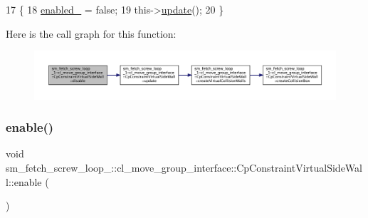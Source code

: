 \begin{DoxyCode}
17         \{
18             \hyperlink{classsm__fetch__screw__loop__1_1_1cl__move__group__interface_1_1CpConstraintVirtualSideWall_a9d17ffd44fe6739ea5e5e4113d470a60}{enabled\_} = \textcolor{keyword}{false};
19             this->\hyperlink{classsm__fetch__screw__loop__1_1_1cl__move__group__interface_1_1CpConstraintVirtualSideWall_a86d9dd2c82600e9b175ee0e456c797a8}{update}();
20         \}
\end{DoxyCode}
Here is the call graph for this function\+:
\nopagebreak
\begin{figure}[H]
\begin{center}
\leavevmode
\includegraphics[width=350pt]{classsm__fetch__screw__loop__1_1_1cl__move__group__interface_1_1CpConstraintVirtualSideWall_a8b26123cf0c582b07f116092c95ac724_cgraph}
\end{center}
\end{figure}
\mbox{\label{classsm__fetch__screw__loop__1_1_1cl__move__group__interface_1_1CpConstraintVirtualSideWall_a99e6ff416d9da148461a7e46ee6b4449}} 
\subsubsection{\texorpdfstring{enable()}{enable()}}
{\footnotesize\ttfamily void sm\+\_\+fetch\+\_\+screw\+\_\+loop\+\_\+::cl\+\_\+move\+\_\+group\+\_\+interface\+::\+Cp\+Constraint\+Virtual\+Side\+Wall\+::enable (\begin{DoxyParamCaption}{ }\end{DoxyParamCaption})}



